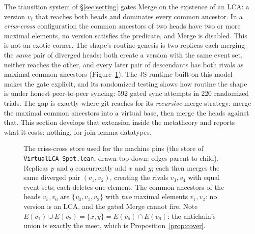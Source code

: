 \documentclass[11pt]{article}
\newcommand{\lean}[1]{\texttt{#1}}
\newcommand{\del}{\mathsf{del}}
\begin{document}
The transition system of \S\ref{sec:setting} gates Merge on the
existence of an LCA: a version $v_\ell$ that reaches both heads and
dominates every common ancestor. In a \emph{criss-cross} configuration
the common ancestors of two heads have two or more maximal elements, no
version satisfies the predicate, and Merge is disabled. This is not an
exotic corner. The shape's routine genesis is two replicas each merging
the \emph{same} pair of diverged heads: both create a version with the
same event set, neither reaches the other, and every later pair of
descendants has both rivals as maximal common ancestors
(Figure~\ref{fig:crisscross}). The JS runtime built on this model makes
the gate explicit, and its randomized testing shows how routine the
shape is under honest peer-to-peer syncing: 592 gated sync attempts in
220 randomized trials. The gap is exactly where git reaches for its
\emph{recursive} merge strategy: merge the maximal common ancestors
into a virtual base, then merge the heads against that. This section
develops that extension inside the metatheory and reports what it
costs: nothing, for join-lemma datatypes.

\begin{figure}[t]
\centering
{}
\caption{The criss-cross store used for the machine pins (the store of
\lean{VirtualLCA\_Spot.lean}, drawn top-down; edges parent to child).
Replicas $p$ and $q$ concurrently add $x$ and $y$; each then merges the
same diverged pair $(v_1, v_2)$, creating the rivals $v_3, v_4$ with
equal event sets; each deletes one element. The common ancestors of the
heads $v_5, v_6$ are $\{v_0, v_1, v_2\}$ with \emph{two} maximal
elements $v_1, v_2$: no version is an LCA, and the gated Merge cannot
fire. Note $E(v_1) \cup E(v_2) = \{x, y\} = E(v_5) \cap E(v_6)$: the
antichain's union is exactly the meet, which is
Proposition~\ref{prop:cover}.}
\label{fig:crisscross}
\end{figure}
\end{document}
